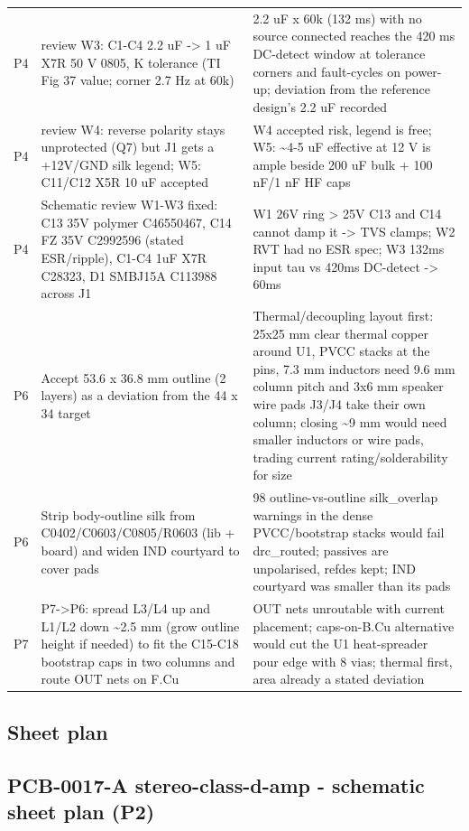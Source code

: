 \documentclass[11pt]{article}
\begin{document}
{\begin{longtable}{lp{5.2cm}p{7.2cm}}
P4 & review W3: C1-C4 2.2 uF -\textgreater{} 1 uF X7R 50 V 0805, K tolerance (TI Fig 37 value; corner 2.7 Hz at 60k) & 2.2 uF x 60k (132 ms) with no source connected reaches the 420 ms DC-detect window at tolerance corners and fault-cycles on power-up; deviation from the reference design's 2.2 uF recorded \\
P4 & review W4: reverse polarity stays unprotected (Q7) but J1 gets a +12V/GND silk legend; W5: C11/C12 X5R 10 uF accepted & W4 accepted risk, legend is free; W5: \textasciitilde{}4-5 uF effective at 12 V is ample beside 200 uF bulk + 100 nF/1 nF HF caps \\
P4 & Schematic review W1-W3 fixed: C13 35V polymer C46550467, C14 FZ 35V C2992596 (stated ESR/ripple), C1-C4 1uF X7R C28323, D1 SMBJ15A C113988 across J1 & W1 26V ring \textgreater{} 25V C13 and C14 cannot damp it -\textgreater{} TVS clamps; W2 RVT had no ESR spec; W3 132ms input tau vs 420ms DC-detect -\textgreater{} 60ms \\
P6 & Accept 53.6 x 36.8 mm outline (2 layers) as a deviation from the 44 x 34 target & Thermal/decoupling layout first: 25x25 mm clear thermal copper around U1, PVCC stacks at the pins, 7.3 mm inductors need 9.6 mm column pitch and 3x6 mm speaker wire pads J3/J4 take their own column; closing \textasciitilde{}9 mm would need smaller inductors or wire pads, trading current rating/solderability for size \\
P6 & Strip body-outline silk from C0402/C0603/C0805/R0603 (lib + board) and widen IND courtyard to cover pads & 98 outline-vs-outline silk\_overlap warnings in the dense PVCC/bootstrap stacks would fail drc\_routed; passives are unpolarised, refdes kept; IND courtyard was smaller than its pads \\
P7 & P7-\textgreater{}P6: spread L3/L4 up and L1/L2 down \textasciitilde{}2.5 mm (grow outline height if needed) to fit the C15-C18 bootstrap caps in two columns and route OUT nets on F.Cu & OUT nets unroutable with current placement; caps-on-B.Cu alternative would cut the U1 heat-spreader pour edge with 8 vias; thermal first, area already a stated deviation \\
\hline
\end{longtable}
}
\subsection*{Sheet plan}
\subsection*{PCB-0017-A stereo-class-d-amp - schematic sheet plan (P2)}
\end{document}
